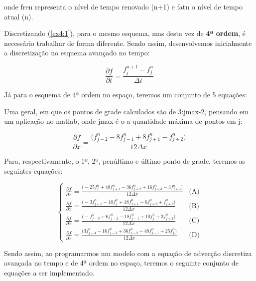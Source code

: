 \documentclass[11pt]{article}
\begin{document}
onde fren representa o nível de tempo renovado (n+1) e fatu o nível de
tempo atual (n).

Discretizando (\ref{ex4:1}), para o mesmo esquema, mas desta vez de
\textbf{4ª ordem}, é necessário trabalhar de forma diferente. Sendo
assim, desenvolvemos inicialmente a discretização no esquema avançado no
tempo:

\begin{equation}
    \frac{\partial{f}}{\partial{t}} = \frac{f^{n+1}_{j} - f^{n}_{j}}{\Delta{t}}
    \label{ex4:5}
\end{equation}

Já para o esquema de 4ª ordem no espaço, teremos um conjunto de 5
equações:

Uma geral, em que os pontos de grade calculados são de 3:jmax-2,
pensando em um aplicação no matlab, onde jmax é o a quantidade máxima de
pontos em j:

\begin{equation}
    \frac{\partial{f}}{\partial{x}} = \frac{\biggl( f^{n}_{j-2} - 8f^{n}_{j-1} + 8f^{n}_{j+1} - f^{n}_{j+2}
    \bigg)}{12\Delta{x}}
    \label{ex4:6}
\end{equation}

Para, respectivamente, o 1º, 2º, penúltimo e último ponto de grade,
teremos as seguintes equações:

\begin{equation}
\begin{cases}
    \frac{\partial{f}}{\partial{x}} = \frac{\biggl( - 25f^{n}_{j} + 48f^{n}_{j+1} - 36f^{n}_{j+2} + 16f^{n}_{j+3} - 3f^{n}_{j+4} \bigg)}{12\Delta{x}} & \text{(A)}\\
    \frac{\partial{f}}{\partial{x}} = \frac{\biggl( - 3f^{n}_{j-1} - 10f^{n}_{j} + 18f^{n}_{j+1} - 6f^{n}_{j+2} + f^{n}_{j+3} \bigg)}{12\Delta{x}} & \text{(B)}\\
    \frac{\partial{f}}{\partial{x}} = \frac{\biggl( - f^{n}_{j-3} + 6f^{n}_{j-2} - 18f^{n}_{j-1} + 10f^{n}_{j} + 3f^{n}_{j+1} \bigg)}{12\Delta{x}} & \text{(C)}\\
    \frac{\partial{f}}{\partial{x}} = \frac{\biggl( 3f^{n}_{j-4} - 16f^{n}_{j-3} + 36f^{n}_{j-2} - 48f^{n}_{j-1} + 25f^{n}_{j} \bigg)}{12\Delta{x}} & \text{(D)}
    \label{ex4:7}
\end{cases}
\end{equation}

Sendo assim, ao programarmos um modelo com a equação de advecção
discretiza avançada no tempo e de 4ª ordem no espaço, teremos o seguinte
conjunto de equações a ser implementado.
\end{document}
